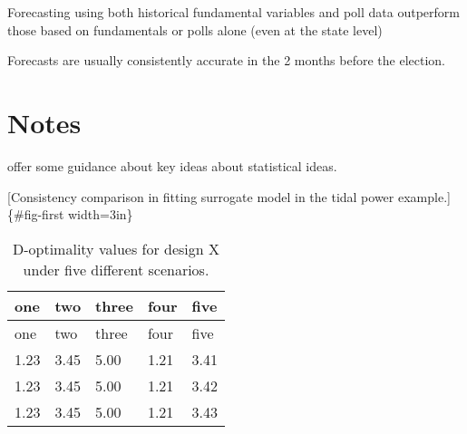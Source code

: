 \documentclass[
  12pt]{article}
\begin{document}
Forecasting using both historical fundamental variables and poll data
outperform those based on fundamentals or polls alone (even at the state
level)

Forecasts are usually consistently accurate in the 2 months before the
election.

\addtolength{\textheight}{-.5in}%

\hypertarget{notes}{%
\section{Notes}\label{notes}}

\citet{abr:2008} offer some guidance about key ideas about statistical
ideas. \citep{abr:2008} \citep{bro:cha:1999} \citep{cam:1996}
\citep{gel:kin:1993} \citep{loc:gel:2010} \citep{rig:2009}
\citep{lin:2013} \citep{riz:2023}

{[}Consistency comparison in fitting surrogate model in the tidal power
example.{]}\{\#fig-first width=3in\}

\hypertarget{tbl-one}{}
\begin{longtable}[]{@{}lllll@{}}
\caption{\label{tbl-one}D-optimality values for design X under five
different scenarios.}\tabularnewline
\toprule()
one & two & three & four & five \\
\midrule()
\endfirsthead
\toprule()
one & two & three & four & five \\
\midrule()
\endhead
1.23 & 3.45 & 5.00 & 1.21 & 3.41 \\
1.23 & 3.45 & 5.00 & 1.21 & 3.42 \\
1.23 & 3.45 & 5.00 & 1.21 & 3.43 \\
\bottomrule()
\end{longtable}


  
\end{document}

